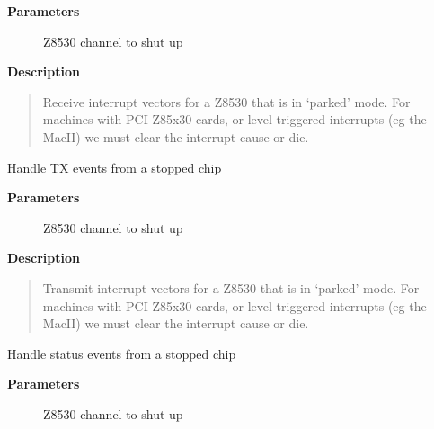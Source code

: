 \documentclass[a4paper,8pt,english]{sphinxmanual}
\begin{document}
\textbf{Parameters}
\begin{description}
\item[{}] \leavevmode
Z8530 channel to shut up

\end{description}

\textbf{Description}
\begin{quote}

Receive interrupt vectors for a Z8530 that is in `parked' mode.
For machines with PCI Z85x30 cards, or level triggered interrupts
(eg the MacII) we must clear the interrupt cause or die.
\end{quote}

\begin{fulllineitems}
\label{networking/z8530book:c.z8530_tx_clear}
Handle TX events from a stopped chip

\end{fulllineitems}


\textbf{Parameters}
\begin{description}
\item[{}] \leavevmode
Z8530 channel to shut up

\end{description}

\textbf{Description}
\begin{quote}

Transmit interrupt vectors for a Z8530 that is in `parked' mode.
For machines with PCI Z85x30 cards, or level triggered interrupts
(eg the MacII) we must clear the interrupt cause or die.
\end{quote}

\begin{fulllineitems}
\label{networking/z8530book:c.z8530_status_clear}
Handle status events from a stopped chip

\end{fulllineitems}


\textbf{Parameters}
\begin{description}
\item[{}] \leavevmode
Z8530 channel to shut up

\end{description}
\end{document}
